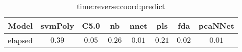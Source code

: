 \begin{table}[!ht]
	\centering
	\begin{tabular}{|c|c|c|c|c|c|c|c|}
		\hline
		Model & svmPoly & C5.0 & nb & nnet & pls & fda & pcaNNet \\ \hline
		elapsed & $0.39$ & $0.05$ & $0.26$ & $0.01$ & $0.21$ & $0.02$ & $0.01$ \\ \hline
	\end{tabular}
	\caption{time:reverse:coord:predict}
	\label{tab:time:reverse:coord:predict}
\end{table}
